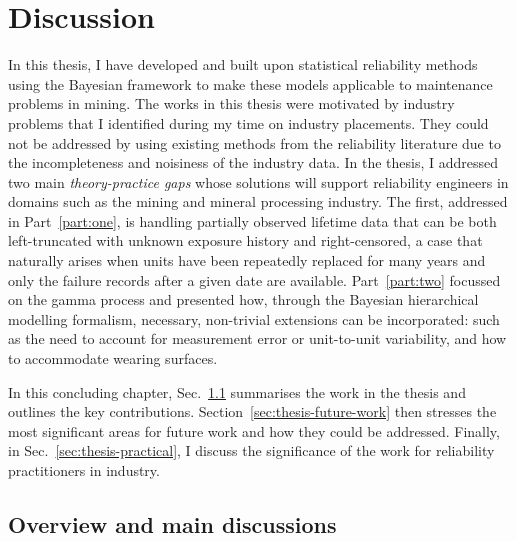 \chapter{Discussion}\label{chap:chapter7}

In this thesis, I have developed and built upon statistical reliability methods using the Bayesian framework to make these models applicable to maintenance problems in mining. The works in this thesis were motivated by industry problems that I identified during my time on industry placements. They could not be addressed by using existing methods from the reliability literature due to the incompleteness and noisiness of the industry data. In the thesis, I addressed two main \textit{theory-practice gaps} whose solutions will support reliability engineers in domains such as the mining and mineral processing industry. The first, addressed in Part~\ref{part:one}, is handling partially observed lifetime data that can be both left-truncated with unknown exposure history and right-censored, a case that naturally arises when units have been repeatedly replaced for many years and only the failure records after a given date are available. Part~\ref{part:two} focussed on the gamma process and presented how, through the Bayesian hierarchical modelling formalism, necessary, non-trivial extensions can be incorporated: such as the need to account for measurement error or unit-to-unit variability, and how to accommodate wearing surfaces.

In this concluding chapter, Sec.~\ref{sec:thesis-summary} summarises the work in the thesis and outlines the key contributions. Section~\ref{sec:thesis-future-work} then stresses the most significant areas for future work and how they could be addressed. Finally, in Sec.~\ref{sec:thesis-practical}, I discuss the significance of the work for reliability practitioners in industry.

\section{Overview and main discussions} \label{sec:thesis-summary}

